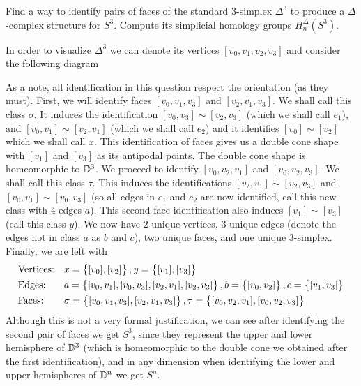 \documentclass[11pt,a4paper]{article}
\begin{document}
\begin{exercise}
  Find a way to identify pairs of faces of the standard $3$-simplex $\Delta^3$
  to produce a $\Delta$-complex structure for $S^3$.
  Compute its simplicial homology groups $H_n^{\Delta}(S^3)$.
\end{exercise}
\begin{solution}
  In order to visualize $\Delta^3$ we can denote its vertices
  $[v_0,v_1,v_2,v_3]$ and consider the following diagram
  \begin{center}
  \end{center}
  As a note, all identification in this question respect the orientation
  (as they must).
  First, we will identify faces $[v_0,v_1,v_3]$ and $[v_2,v_1,v_3]$.
  We shall call this class $\sigma$.
  It induces the identification $[v_0,v_3] \sim [v_2,v_3]$ (which we shall
  call $e_1$), and $[v_0,v_1] \sim [v_2,v_1]$ (which we shall call $e_2$)
  and it identifies $[v_0] \sim [v_2]$ which we shall call $x$.
  This identification of faces gives us a double cone shape with $[v_1]$
  and $[v_3]$ as its antipodal points.
  The double cone shape is homeomorphic to $\mathbb{D}^3$.
  We proceed to identify $[v_0,v_2,v_1]$ and $[v_0,v_2,v_3]$.
  We shall call this class $\tau$.
  This induces the identifications $[v_2,v_1] \sim [v_2,v_3]$ and
  $[v_0,v_1] \sim [v_0,v_3]$
  (so all edges in $e_1$ and $e_2$ are now identified, call this new class
  with $4$ edges $a$).
  This second face identification also induces $[v_1] \sim [v_3]$
  (call this class $y$).
  We now have $2$ unique vertices, $3$ unique edges (denote the edges not
  in class $a$ as $b$ and $c$), two unique faces, and one unique $3$-simplex.
  Finally, we are left with
  \begin{align*}
    &\text{Vertices:} && x = \left\{[v_0],[v_2]\right\}, y = \left\{[v_1],[v_3]\right\} \\
    &\text{Edges:} && a = \left\{[v_0,v_1],[v_0,v_3],[v_2,v_1],[v_2,v_3]\right\},
      b = \left\{[v_0,v_2]\right\}, c = \left\{[v_1,v_3]\right\} \\
    &\text{Faces:} && \sigma = \left\{[v_0,v_1,v_3],[v_2,v_1,v_3]\right\},
      \tau = \left\{[v_0,v_2,v_1],[v_0,v_2,v_3]\right\}
  \end{align*}
  Although this is not a very formal justification,
  we can see after identifying the second pair of faces we get $S^3$,
  since they represent the upper and lower hemisphere of $\mathbb{D}^3$
  (which is homeomorphic to the double cone we obtained after the first
  identification), and in any dimension when identifying the lower and upper
  hemispheres of $\mathbb{D}^n$ we get $S^n$.


\end{solution}
\end{document}

